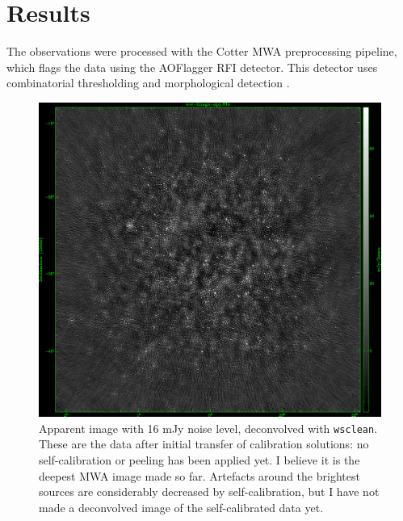 \documentclass[a4paper,10pt]{article}
\begin{document}
\section{Results}
The observations were processed with the Cotter MWA preprocessing pipeline, which flags the data using the AOFlagger RFI detector. This detector uses combinatorial thresholding \citep{post-correlation-rfi-classification} and morphological detection \citep{scale-invariant-rank-operator}.
\begin{figure}
\begin{center}
\includegraphics[width=12.5cm]{Apparent-image-EoR0.png}
\caption{Apparent image with 16 mJy noise level, deconvolved with {\tt wsclean}. These are the data after initial transfer of calibration solutions: no self-calibration or peeling has been applied yet. I believe it is the deepest MWA image made so far. Artefacts around the brightest sources are considerably decreased by self-calibration, but I have not made a deconvolved image of the self-calibrated data yet.}
\label{fig:eor0}
\end{center}
\end{figure}
\end{document}
